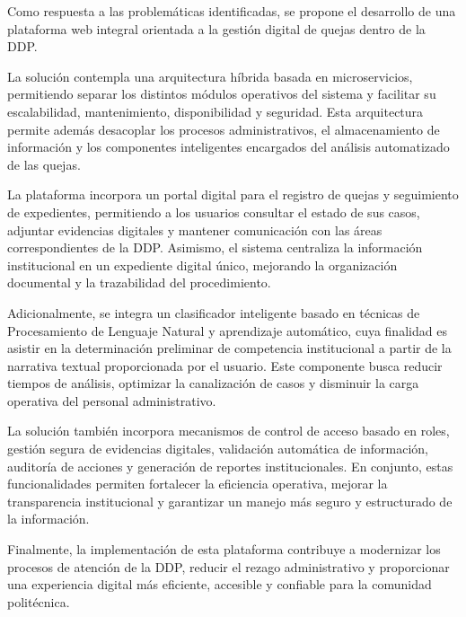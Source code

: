 Como respuesta a las problemáticas identificadas, se propone el desarrollo de una plataforma web integral orientada a la gestión digital de quejas dentro de la DDP.

La solución contempla una arquitectura híbrida basada en microservicios, permitiendo separar los distintos módulos operativos del sistema y facilitar su escalabilidad, mantenimiento, disponibilidad y seguridad. Esta arquitectura permite además desacoplar los procesos administrativos, el almacenamiento de información y los componentes inteligentes encargados del análisis automatizado de las quejas.

La plataforma incorpora un portal digital para el registro de quejas y seguimiento de expedientes, permitiendo a los usuarios consultar el estado de sus casos, adjuntar evidencias digitales y mantener comunicación con las áreas correspondientes de la DDP. Asimismo, el sistema centraliza la información institucional en un expediente digital único, mejorando la organización documental y la trazabilidad del procedimiento.

Adicionalmente, se integra un clasificador inteligente basado en técnicas de Procesamiento de Lenguaje Natural y aprendizaje automático, cuya finalidad es asistir en la determinación preliminar de competencia institucional a partir de la narrativa textual proporcionada por el usuario. Este componente busca reducir tiempos de análisis, optimizar la canalización de casos y disminuir la carga operativa del personal administrativo.

La solución también incorpora mecanismos de control de acceso basado en roles, gestión segura de evidencias digitales, validación automática de información, auditoría de acciones y generación de reportes institucionales. En conjunto, estas funcionalidades permiten fortalecer la eficiencia operativa, mejorar la transparencia institucional y garantizar un manejo más seguro y estructurado de la información.

Finalmente, la implementación de esta plataforma contribuye a modernizar los procesos de atención de la DDP, reducir el rezago administrativo y proporcionar una experiencia digital más eficiente, accesible y confiable para la comunidad politécnica.